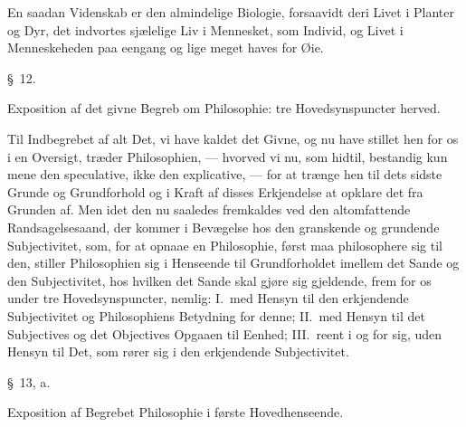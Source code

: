 \documentclass[12pt,a4paper]{book}
\newcommand{\apage}[1]{\marginnote{\footnotesize\textit{[#1]}}}
\begin{document}
{\small En saadan Videnskab er den almindelige Biologie, forsaavidt deri Livet i
Planter og Dyr, det indvortes sjælelige Liv i Mennesket, som Individ, og Livet i
Menneskeheden paa eengang og lige meget haves for Øie.\par}

\begin{center}\large\S~12.\end{center}
\begin{center}Exposition af det givne Begreb om Philosophie: tre
Hovedsynspuncter herved.\end{center}

Til Indbegrebet af alt Det, vi have kaldet det Givne, \apage{42}  og nu have stillet hen for os
i en Oversigt, træder Philosophien, --- hvorved vi nu, som hidtil, bestandig kun
mene den speculative, ikke den explicative, --- for at trænge hen til dets sidste
Grunde og Grundforhold og i Kraft af disses Erkjendelse at opklare det fra Grunden
af. Men idet den nu saaledes fremkaldes ved den altomfattende Randsagelsesaand, der
kommer i Bevægelse hos den granskende og grundende Subjectivitet, som, for at opnaae
en Philosophie, først maa philosophere sig til den, stiller Philosophien sig i
Henseende til Grundforholdet imellem det Sande og den Subjectivitet, hos hvilken det
Sande skal gjøre sig gjeldende, frem for os under tre Hovedsynspuncter, nemlig:
I.~med Hensyn til den erkjendende Subjectivitet og Philosophiens Betydning for
denne; II.~med Hensyn til det Subjectives og det Objectives Opgaaen til Eenhed;
III.~reent i og for sig, uden Hensyn til Det, som rører sig i den erkjendende
Subjectivitet.

\begin{center}\large\S~13, a.\end{center}
\begin{center}Exposition af Begrebet Philosophie i første Hovedhenseende.\end{center}
\end{document}
